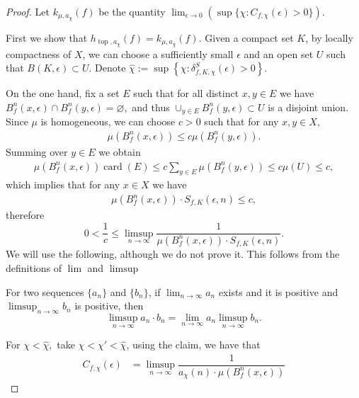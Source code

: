 \documentclass[10pt,a4paper]{amsart}
\DeclareMathOperator{\card}{card}
\newcommand{\e}{\epsilon}
\newcommand{\topo}{\operatorname{top}}
\renewcommand{\emptyset}{\varnothing} %
\begin{document}
\begin{proof}
Let $\displaystyle k_{\mu ,a_{\chi }} (f)$ be the quantity $\displaystyle\lim_{\e \to 0} \left(\sup \{ \chi : C_{f,\chi}(\e) > 0 \}\right).$
  
  First we show that $h_{\topo,a_{\chi }} (f) = k_{\mu ,a_{\chi }}(f). $ Given a compact set $K$, by locally compactness of $X$, we can choose a sufficiently small $\e $ and an open set $U$  such that $B (K,\e ) \subset U.$ Denote $ \hat{\chi }:=\sup \left\{ \chi : \delta ^S_{f,K, \chi } (\e ) >0\right\} $. 

  On the one hand, fix a set $E$ such that for all distinct $x,y \in E$ we have $B^n_f(x,\e ) \cap B^n _f (y,\e ) = \emptyset,$  and thus $\cup _{y \in E} B^n_f(y,\e ) \subset U$ is a disjoint union. Since $\mu $ is homogeneous, we can choose $c>0$ such that for any $x,y \in X,$  
  \begin{align*}
    \mu \left( B^n_f (x,\e ) \right) \le c \mu \left( B^n_f (y,\e ) \right) .
  \end{align*}
  Summing over $y \in E$ we obtain 
  \begin{align*}
    \mu \left( B^n_f (x,\e ) \right) \card (E) \le c \sum_{y \in E} \mu \left( B^n_f(y,\e ) \right) \le c \mu (U) \le c,
  \end{align*}
  which implies that for any $x \in X$ we have
  \begin{align*}
    \mu \left( B^n_f (x,\e ) \right) \cdot S_{f,K} (\e,n)  \le c,
  \end{align*}
  therefore 
  \begin{equation*}
      0< \frac{1}{c} \le \limsup_{n\to \infty} \dfrac{1}{ \mu(B_f^n(x,\e))\cdot S_{f,K}(\e,n)}.
  \end{equation*}
  We will use the following, although we do not prove it. This follows from the definitions of $\lim$ and $\limsup$
  \begin{CLAIME}
      For two sequences $\{a_n\}$ and $\{b_n\}$, if $\lim_{n \to \infty} a_n$ exists and it is positive and $\limsup_{n\to \infty} b_n$ is positive, then
      \begin{equation*}
          \limsup_{n \to \infty} a_n \cdot b_n = \lim_{n\to \infty}a_n \limsup_{n \to \infty}b_n.
      \end{equation*}
  \end{CLAIME}
  For $\chi <  \hat{\chi }, $ take $\chi<\chi'<\hat{\chi}$, using the claim, we have that
  \begin{align*}
    C_{f ,\chi }(\e) 
    &= \limsup_{n\to\infty}\dfrac{1}{a_\chi(n) \cdot \mu(B_f^n(x,\e))} 

\end{align*}
\end{proof}
\end{document}
